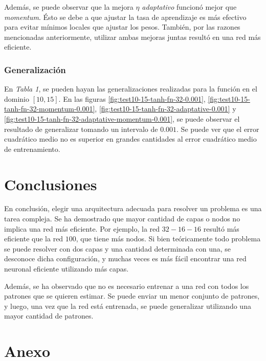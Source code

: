\documentclass[12pt,a4paper]{article}
\begin{document}
Además, se puede observar que la mejora \emph{$\eta$ adaptativo} funcionó mejor que \emph{momentum}. Ésto se debe a que ajustar la tasa de aprendizaje es más efectivo para evitar mínimos locales que ajustar los pesos. También, por las razones mencionadas anteriormente, utilizar ambas mejoras juntas resultó en una red más eficiente.

\subsubsection{Generalización}

En \emph{Tabla 1}, se pueden hayan las generalizaciones realizadas para la función en el dominio $[10,15]$. En las figuras \ref{fig:test10-15-tanh-fn-32-0.001}, \ref{fig:test10-15-tanh-fn-32-momentum-0.001}, \ref{fig:test10-15-tanh-fn-32-adaptative-0.001} y \ref{fig:test10-15-tanh-fn-32-adaptative-momentum-0.001}, se puede observar el resultado de generalizar tomando un intervalo de $0.001$. Se puede ver que el error cuadrático medio no es superior en grandes cantidades al error cuadrático medio de entrenamiento. 

\section{Conclusiones}

En conclusión, elegir una arquitectura adecuada para resolver un problema es una tarea compleja. Se ha demostrado que mayor cantidad de capas o nodos no implica una red más eficiente. Por ejemplo, la red $32-16-16$ resultó más eficiente que la red $100$, que tiene más nodos. Si bien teóricamente todo problema se puede resolver con dos capas y una cantidad determinada con una, se desconoce dicha configuración, y muchas veces es más fácil encontrar una red neuronal eficiente utilizando más capas.

Además, se ha observado que no es necesario entrenar a una red con todos los patrones que se quieren estimar. Se puede enviar un menor conjunto de patrones, y luego, una vez que la red está entrenada, se puede generalizar utilizando una mayor cantidad de patrones.

\clearpage
\appendix
\renewcommand{\figurename}{Figura}
\section{Anexo}
\end{document}
